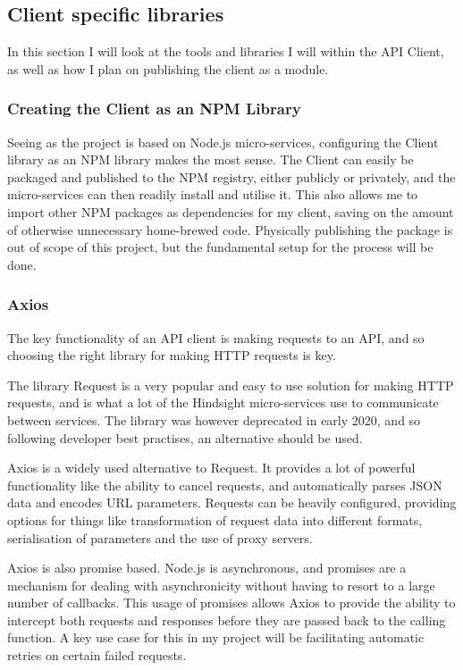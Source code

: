 \subsection{Client specific libraries}
In this section I will look at  the tools and libraries I will within the API Client, as well as how I plan on publishing the client as a module. 
\subsubsection{Creating the Client as an NPM Library}
Seeing as the project is based on Node.js micro-services, configuring the Client library as an NPM library makes the most sense. The Client can easily be packaged and published to the NPM registry, either publicly or privately, and the micro-services can then readily install and utilise it. This also allows me to import other NPM packages as dependencies for my client, saving on the amount of otherwise unnecessary home-brewed code. Physically publishing the package is out of scope of this project, but the fundamental setup for the process will be done.
\subsubsection{Axios}
The key functionality of an API client is making requests to an API, and so choosing the right library for making HTTP requests is key.

The library Request is a very popular and easy to use solution for making HTTP requests, and is what a lot of the Hindsight micro-services use to communicate between services. The library was however deprecated in early 2020, and so following developer best practises, an alternative should be used.

Axios is a widely used alternative to Request. It provides a lot of powerful functionality like the ability to cancel requests, and automatically parses JSON data and encodes URL parameters. Requests can be heavily configured, providing options for things like transformation of request data into different formats, serialisation of parameters and the use of proxy servers.

Axios is also promise based. Node.js is asynchronous, and promises are a mechanism for dealing with asynchronicity without having to resort to a large number of callbacks. This usage of promises allows Axios to provide the ability to intercept both requests and responses before they are passed back to the calling function. A key use case for this in my project will be facilitating automatic retries on certain failed requests. 
